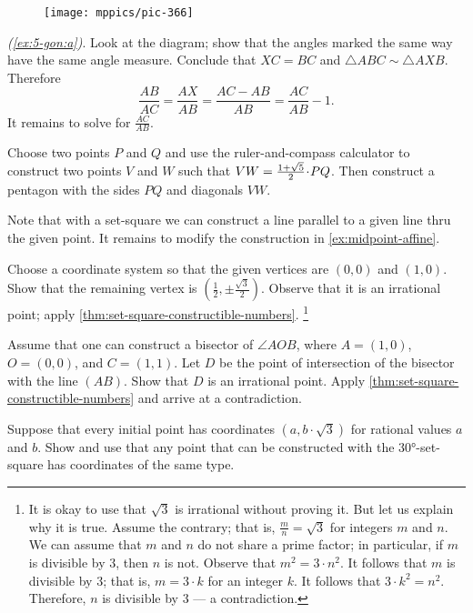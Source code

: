 {

\begin{wrapfigure}{r}{27mm}
\vskip-4mm
\centering
\texttt{[image: mppics/pic-366]}
\end{wrapfigure}

\parbf{\ref{ex:5-gon},} \textit{(\ref{ex:5-gon:a})}.
Look at the diagram;
show that the angles marked the same way have the same angle measure.
Conclude that $XC=BC$ and $\triangle ABC\sim \triangle AXB$.
Therefore 
\[\frac{AB}{AC}=\frac{AX}{AB}=\frac{AC-AB}{AB}=\frac{AC}{AB}-1.\]
It remains to solve for $\frac{AC}{AB}$.

}

Choose two points $P$ and $Q$ and use the ruler-and-compass calculator to construct two points $V$ and $W$ such that $VW\z=\tfrac{1+\sqrt5}2\cdot PQ$.
Then construct a pentagon with the sides $PQ$ and diagonals $VW$.

Note that with a set-square we can construct a line parallel to a given line thru the given point.
It remains to modify the construction in \ref{ex:midpoint-affine}.

Choose a coordinate system so that the given vertices are $(0,0)$ and $(1,0)$.
Show that the remaining vertex is $(\tfrac12,\pm\tfrac{\sqrt{3}}2)$.
Observe that it is an irrational point; apply \ref{thm:set-square-constructible-numbers}.%
\footnote{It is okay to use that $\sqrt{3}$ is irrational without proving it.
But let us explain why it is true. 
Assume the contrary; that is, $\tfrac mn=\sqrt{3}$ for integers $m$ and $n$.
We can assume that $m$ and $n$ do not share a prime factor; in particular, if $m$ is divisible by $3$, then $n$ is not.
Observe that $m^2=3\cdot n^2$.
It follows that $m$ is divisible by 3; that is, $m=3\cdot k$ for an integer $k$.
It follows that $3\cdot k^2=n^2$.
Therefore, $n$ is divisible by 3 --- a contradiction.} 

Assume that one can construct a bisector of $\angle AOB$, where $A=(1,0)$, $O=(0,0)$, and $C=(1,1)$.
Let $D$ be the point of intersection of the bisector with the line $(AB)$.
Show that $D$ is an irrational point.
Apply \ref{thm:set-square-constructible-numbers} and arrive at a contradiction.

Suppose that every initial point has coordinates $(a,b\cdot\sqrt{3})$ for rational values $a$ and $b$.
Show and use that any point that can be constructed with the 30°-set-square has coordinates of the same type.

